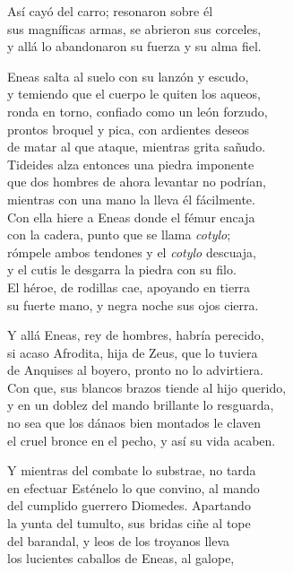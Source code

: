 Así cayó del carro; resonaron sobre él\\
sus magníficas armas, se abrieron sus corceles,\\
y allá lo abandonaron su fuerza y su alma fiel.\par
Eneas salta al suelo con su lanzón y escudo,\\
y temiendo que el cuerpo le quiten los aqueos,\\
ronda en torno, confiado como un león forzudo,\\
prontos broquel y pica, con ardientes deseos\\
de matar al que ataque, mientras grita sañudo.\\
Tideides alza entonces una piedra imponente\\
que dos hombres de ahora levantar no podrían,\\
mientras con una mano la lleva él fácilmente.\\
Con ella hiere a Eneas donde el fémur encaja\\
con la cadera, punto que se llama \emph{cotylo};\\
rómpele ambos tendones y el \emph{cotylo} descuaja,\\
y el cutis le desgarra la piedra con su filo.\\
El héroe, de rodillas cae, apoyando en tierra\\
su fuerte mano, y negra noche sus ojos cierra.\par
Y allá Eneas, rey de hombres, habría perecido,\\
si acaso Afrodita, hija de Zeus, que lo tuviera\\
de Anquises al boyero, pronto no lo advirtiera.\\
Con que, sus blancos brazos tiende al hijo querido,\\
y en un doblez del mando brillante lo resguarda,\\
no sea que los dánaos bien montados le claven\\
el cruel bronce en el pecho, y así su vida acaben.\par
Y mientras del combate lo substrae, no tarda\\
en efectuar Esténelo lo que convino, al mando\\
del cumplido guerrero Diomedes. Apartando\\
la yunta del tumulto, sus bridas ciñe al tope\\
del barandal, y leos de los troyanos lleva\\
los lucientes caballos de Eneas, al galope,\\
